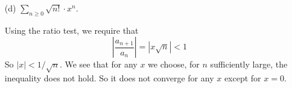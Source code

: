 \documentclass{article}
\begin{document}
\begin{itemize}
        \item [(d)] $\sum_{n \geq 0} \sqrt{n!} \cdot x^{n}$. 
            \begin{answer}
                Using the ratio test, we require that
                    \begin{equation*}
                        \left\lvert \dfrac{a_{n + 1}}{a_{n}} \right\rvert = \left\lvert x\sqrt{n} \right\rvert < 1
                    \end{equation*}
                So $\lvert x \rvert < 1/\sqrt{n}$. We see that for any $x$ we choose, for $n$ sufficiently large, the inequality does not hold. So it does not converge for any $x$ except for $x = 0$.
            \end{answer}
    \end{itemize}

\newpage
\end{document}
